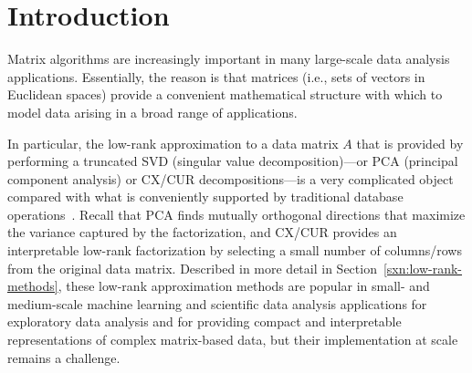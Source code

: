 \section{Introduction}
\label{sec:intro}

Matrix algorithms are increasingly important in many large-scale data analysis applications.
Essentially, the reason is that matrices (i.e., sets of vectors in Euclidean
spaces) provide a convenient mathematical structure with which to model data
arising in a broad range of applications.

In particular, the low-rank approximation to a data matrix $A$ that is provided
by performing a truncated SVD (singular value decomposition)---or PCA
(principal component analysis) or CX/CUR decompositions---is a very complicated
object compared with what is conveniently supported by traditional database
operations~\cite{Skillicorn07}. Recall that PCA finds mutually orthogonal
directions that maximize the variance captured by the factorization, and CX/CUR
provides an interpretable low-rank factorization by selecting a small number of
columns/rows from the original data matrix.  Described in more detail in
Section~\ref{sxn:low-rank-methods}, these low-rank approximation methods are
popular in small- and medium-scale machine learning and scientific data
analysis applications for exploratory data analysis and for
providing compact and interpretable representations of complex matrix-based
data, but their implementation at scale remains a challenge.


